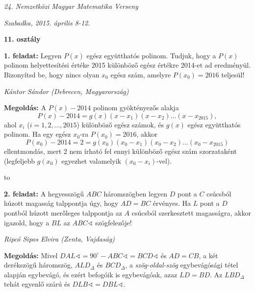 \documentclass[a4paper,10pt]{article}
\newcommand{\ki}[2]{\hfill {\it #1 (#2)}\medskip}
\newcommand{\vonal}{\hbox to \hsize{\hskip2truecm\hrulefill\hskip2truecm}}
\begin{document}
\begin{center} \Large {\em 24. Nemzetközi Magyar Matematika Verseny} \end{center}
\begin{center} \large{\em Szabadka, 2015. április 8-12.} \end{center}
\smallskip
\begin{center} \large{\bf 11. osztály} \end{center}
\bigskip 

{\bf 1. feladat: } Legyen $P(x)$ egész együtthatós polinom. Tudjuk, hogy a $P(x)$ polinom helyettesítési értéke 2015 különböző egész értékre 2014-et ad eredményül. Bizonyítsd be, hogy nincs olyan $x_0$ egész szám, amelyre $P(x_0)=2016$ teljesül!

\ki{Kántor Sándor}{Debrecen, Magyarország}\medskip

{\bf Megoldás: } 
A $P(x)-2014$ polinom gyöktényezős alakja 
$$P(x)-2014=g(x)(x-x_1)(x-x_2)\ldots(x-x_{2015}),$$
ahol $x_i$ ($i=1, 2, \ldots, 2015$) különböző egész számok, és $g(x)$ egész együtthatós polinom. Ha egy egész $x_0$-ra $P(x_0)=2016$, akkor 
$$P(x_0)-2014=2=g(x_0)(x_0-x_1)(x_0-x_2)\ldots(x_0-x_{2015})$$
ellentmondás, mert 2 nem írható fel ennyi különböző
egész szám szorzataként
 (legfeljebb $g(x_0)$ egyezhet valamelyik $(x_0-x_i)$-vel).


\vonal

{\bf 2. feladat: } A hegyesszögű $ABC$ háromszögben legyen $D$ pont a $C$ csúcsból húzott magasság talppontja úgy, hogy $AD=BC$ érvényes. Ha $L$ pont a $D$ pontból húzott merőleges talppontja az $A$ csúcsból szerkesztett magasságra, akkor igazold, hogy a $BL$ az $ABC\sphericalangle$ szögfelezője!

\ki{Ripcó Sipos Elvira}{Zenta, Vajdaság}\medskip

{\bf Megoldás: } Mivel $DAL\sphericalangle=90^\circ-ABC\sphericalangle=BCD\sphericalangle$ és $AD=CB$, a két derékszögű háromszög, $ALD_{\Delta}$ és $BCD_{\Delta}$, a \textit{szög-oldal-szög} egybevágósági tétel alapján egybevágó, és ezért befogóik is egybevágóak, azaz $LD=BD$. Az $LBD_{\Delta}$ tehát egyenlő szárú és 
$DLB\sphericalangle=DBL\sphericalangle$.
\end{document}
